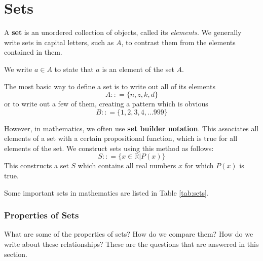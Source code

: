 \chapter{Sets}
A \textbf{set} is an unordered collection of objects, called its \emph{elements}. We generally write sets in capital letters, such as $A$, to contrast them from the elements contained in them.

We write $a \in A$ to state that $a$ is an element of the set $A$.

The most basic way to define a set is to write out all of its elements
\[ A : : = \{ n, z, k, d \} \]
or to write out a few of them, creating a pattern which is obvious
\[ B : : = \{ 1, 2, 3, 4, \ldots 999 \} \]

However, in mathematics, we often use \textbf{set builder notation}.
This associates all elements of a set with a certain propositional function, which is true for all elements of the set.
We construct sets using this method as follows:
\[ S : : = \big\{ x\in\mathbb R \big| P(x)\big\} \]
This constructs a set $S$ which contains all real numbers $x$ for which $P(x)$ is true.

Some important sets in mathematics are listed in Table \ref{tab:sets}.
\begin{table}
  \centering
  \caption{Important sets.}
  \label{tab:sets}
\end{table}

\subsection{Properties of Sets}

What are some of the properties of sets?
How do we compare them?
How do we write about these relationships?
These are the questions that are answered in this section.


